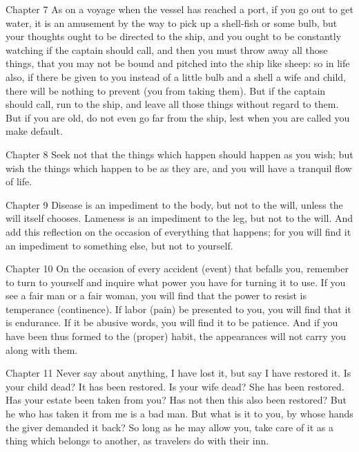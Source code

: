 Chapter 7 As on a voyage when the vessel has reached a port, if you go out to get water, it is an amusement by the way to pick up a shell-fish or some bulb, but your thoughts ought to be directed to the ship, and you ought to be constantly watching if the captain should call, and then you must throw away all those things, that you may not be bound and pitched into the ship like sheep: so in life also, if there be given to you instead of a little bulb and a shell a wife and child, there will be nothing to prevent (you from taking them). But if the captain should call, run to the ship, and leave all those things without regard to them. But if you are old, do not even go far from the ship, lest when you are called you make default.



Chapter 8 Seek not that the things which happen should happen as you wish; but wish the things which happen to be as they are, and you will have a tranquil flow of life.



Chapter 9 Disease is an impediment to the body, but not to the will, unless the will itself chooses. Lameness is an impediment to the leg, but not to the will. And add this reflection on the occasion of everything that happens; for you will find it an impediment to something else, but not to yourself.



Chapter 10 On the occasion of every accident (event) that befalls you, remember to turn to yourself and inquire what power you have for turning it to use. If you see a fair man or a fair woman, you will find that the power to resist is temperance (continence). If labor (pain) be presented to you, you will find that it is endurance. If it be abusive words, you will find it to be patience. And if you have been thus formed to the (proper) habit, the appearances will not carry you along with them.



Chapter 11 Never say about anything, I have lost it, but say I have restored it. Is your child dead? It has been restored. Is your wife dead? She has been restored. Has your estate been taken from you? Has not then this also been restored? But he who has taken it from me is a bad man. But what is it to you, by whose hands the giver demanded it back? So long as he may allow you, take care of it as a thing which belongs to another, as travelers do with their inn.



